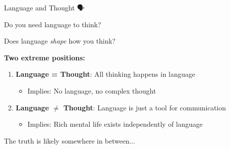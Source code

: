 \documentclass[aspectratio=169]{beamer}
\begin{document}
\begin{frame}[shrink=5]{Language and Thought 🗣️💭}
\begin{discussion}
Do you need language to think?

Does language \textit{shape} how you think?
\end{discussion}

\vspace{0.3cm}

\small
\textbf{Two extreme positions:}
\begin{enumerate}\setlength{\itemsep}{0pt}\setlength{\itemsep}{0pt}
    \item \textbf{Language = Thought}: All thinking happens in language
    \begin{itemize}\setlength{\itemsep}{0pt}\setlength{\itemsep}{0pt}
        \item Implies: No language, no complex thought
    \end{itemize}
    \item \textbf{Language $\neq$ Thought}: Language is just a tool for communication
    \begin{itemize}\setlength{\itemsep}{0pt}\setlength{\itemsep}{0pt}
        \item Implies: Rich mental life exists independently of language
    \end{itemize}
\end{enumerate}

\vspace{0.2cm}

The truth is likely somewhere in between...
\end{frame}
\end{document}
